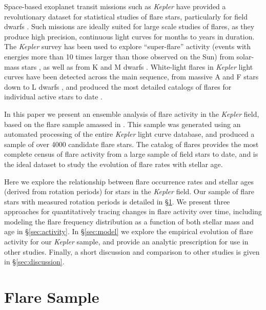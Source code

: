 \documentclass[preprint2]{aastex62}
\newcommand{\Kepler}{\textsl{Kepler}\xspace}
\begin{document}
Space-based exoplanet transit missions such as \Kepler \citep{borucki2010} have provided a revolutionary dataset for statistical studies of flare stars, particularly for field dwarfs \citep{walkowicz2011}. Such missions are ideally suited for large scale studies of flares, as they produce high precision, continuous light curves for months to years in duration.
The \Kepler survey has been used to explore ``super-flare'' activity (events with energies more than 10 times larger than those observed on the Sun) from solar-mass stars \citep{shibayama2013}, as well as from K and M dwarfs \citep{candelaresi2014}. White-light flares in \Kepler light curves have been detected across the main sequence, from massive A and F stars \citep{balona2012} down to L dwarfs \citep{gizis2013}, and produced the most detailed catalogs of flares for individual active stars to date \citep{hawley2014,davenport2014b}. 


In this paper we present an ensemble analysis of flare activity in the \Kepler field, based on the flare sample amassed in \citet{davenport2016}. This sample was generated using an automated processing of the entire \Kepler light curve database, and produced a sample of over 4000 candidate flare stars. The \citet{davenport2016} catalog of flares provides the most complete census of flare activity from a large sample of field stars to date, and is the ideal dataset to study the evolution of flare rates with stellar age.


Here we explore the relationship between flare occurrence rates and stellar ages (derived from rotation periods) for stars in the \Kepler field. Our sample of flare stars with measured rotation periods is detailed in \S\ref{sec:sample}.
We present three approaches for quantitatively tracing changes in flare activity over time, including modeling the flare frequency distribution as a function of both stellar mass and age in \S\ref{sec:activity}. In \S\ref{sec:model} we explore the empirical evolution of flare activity for our \Kepler sample, and provide an analytic prescription for use in other studies. Finally, a short discussion and comparison to other studies is given in \S\ref{sec:discussion}.




\section{Flare Sample}
\label{sec:sample}
\end{document}
